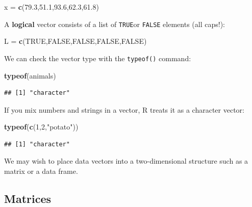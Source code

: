 \documentclass[
]{book}
\newenvironment{Shaded}{\begin{snugshade}}{\end{snugshade}}
\newcommand{\ConstantTok}[1]{\textcolor[rgb]{0.56,0.35,0.01}{#1}}
\newcommand{\DecValTok}[1]{\textcolor[rgb]{0.00,0.00,0.81}{#1}}
\newcommand{\FloatTok}[1]{\textcolor[rgb]{0.00,0.00,0.81}{#1}}
\newcommand{\FunctionTok}[1]{\textcolor[rgb]{0.13,0.29,0.53}{\textbf{#1}}}
\newcommand{\NormalTok}[1]{#1}
\newcommand{\OtherTok}[1]{\textcolor[rgb]{0.56,0.35,0.01}{#1}}
\newcommand{\StringTok}[1]{\textcolor[rgb]{0.31,0.60,0.02}{#1}}
\theoremstyle{definition}
\theoremstyle{definition}
\theoremstyle{definition}
\theoremstyle{definition}
\theoremstyle{remark}
\begin{document}
\begin{Shaded}
\begin{Highlighting}[]
\NormalTok{x }\OtherTok{=} \FunctionTok{c}\NormalTok{(}\FloatTok{79.3}\NormalTok{,}\FloatTok{51.1}\NormalTok{,}\FloatTok{93.6}\NormalTok{,}\FloatTok{62.3}\NormalTok{,}\FloatTok{61.8}\NormalTok{)}
\end{Highlighting}
\end{Shaded}

A \textbf{logical} vector consists of a list of \texttt{TRUE}or \texttt{FALSE} elements (all caps!):

\begin{Shaded}
\begin{Highlighting}[]
\NormalTok{L }\OtherTok{=} \FunctionTok{c}\NormalTok{(}\ConstantTok{TRUE}\NormalTok{,}\ConstantTok{FALSE}\NormalTok{,}\ConstantTok{FALSE}\NormalTok{,}\ConstantTok{FALSE}\NormalTok{,}\ConstantTok{FALSE}\NormalTok{)}
\end{Highlighting}
\end{Shaded}

We can check the vector type with the \texttt{typeof()} command:

\begin{Shaded}
\begin{Highlighting}[]
\FunctionTok{typeof}\NormalTok{(animals)}
\end{Highlighting}
\end{Shaded}

\begin{verbatim}
## [1] "character"
\end{verbatim}

If you mix numbers and strings in a vector, R treats it as a character vector:

\begin{Shaded}
\begin{Highlighting}[]
\FunctionTok{typeof}\NormalTok{(}\FunctionTok{c}\NormalTok{(}\DecValTok{1}\NormalTok{,}\DecValTok{2}\NormalTok{,}\StringTok{"potato"}\NormalTok{))}
\end{Highlighting}
\end{Shaded}

\begin{verbatim}
## [1] "character"
\end{verbatim}

We may wish to place data vectors into a two-dimensional structure such as a matrix or a data frame.

\subsection*{Matrices}\label{matrices}
\end{document}
